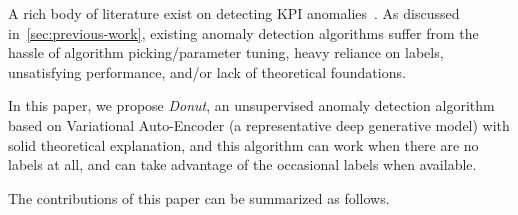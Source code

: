 \documentclass[sigconf]{acmart}
\newcommand\devcomment[1]{\textcolor{red}{***{#1}***}}
\newcommand\devcomment[1]{}
\newcommand{\DONUT}{\textit{Donut}}
\newcommand{\EG}{\textit{e.g.}}
\begin{document}
A rich body of literature exist on detecting KPI anomalies~\cite{ad-survey,historical-avg,MA,arma,arima,kalman,holt-winters,TSD,svd,wavelet,majority_vote,normalization_schema,opprentice,egads,one-class-svm1,deep-learning-svm,GMM, kde,vae-ad,vi-storn}.
As discussed in~\cref{sec:previous-work}, existing anomaly detection algorithms suffer from the hassle of algorithm picking/parameter tuning, heavy reliance on labels, unsatisfying performance, and/or lack of theoretical foundations.


In this paper, we propose \DONUT{}, an unsupervised anomaly detection algorithm based on Variational Auto-Encoder (a representative deep generative model) with solid theoretical explanation, and this algorithm can work when there are no labels at all, and can take advantage of the occasional labels when available.

The contributions of this paper can be summarized as follows.

\end{document}

